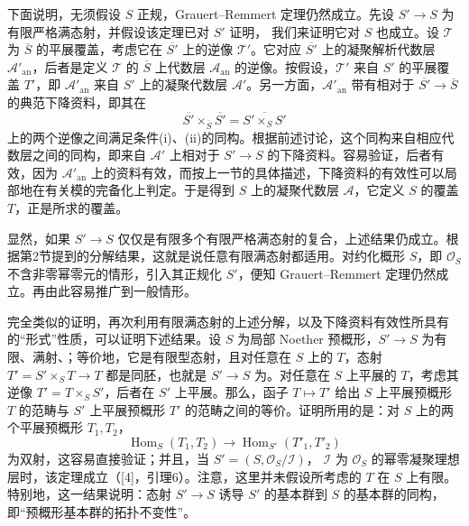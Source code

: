 下面说明，无须假设 $S$ 正规，Grauert--Remmert 定理仍然成立。先设 $S'\to S$ 为有限严格满态射，并假设该定理已对 $S'$ 证明，
我们来证明它对 $S$ 也成立。设 $\mathcal T$ 为 $\overline S$ 的平展覆盖，考虑它在 $\overline {S'}$ 上的逆像 $\mathcal T'$。它对应 $\overline {S'}$ 上的凝聚解析代数层 $\mathcal A'_{\mathrm{an}}$，后者是定义 $\mathcal T$ 的 $\overline S$ 上代数层 $\mathcal A_{\mathrm{an}}$ 的逆像。按假设，$\mathcal T'$ 来自 $S'$ 的平展覆盖 $T'$，即 $\mathcal A'_{\mathrm{an}}$ 来自 $S'$ 上的凝聚代数层 $\mathcal A'$。另一方面，$\mathcal A'_{\mathrm{an}}$ 带有相对于 $\overline {S'}\to\overline S$ 的典范下降资料，即其在
\[
\overline {S'}\times_{\overline S}\overline {S'}
=\overline{S'\times_SS'}
\]
上的两个逆像之间满足条件(i)、(ii)的同构。根据前述讨论，这个同构来自相应代数层之间的同构，即来自 $\mathcal A'$ 上相对于 $S'\to S$ 的下降资料。容易验证，后者有效，因为 $\mathcal A'_{\mathrm{an}}$ 上的资料有效，而按上一节的具体描述，下降资料的有效性可以局部地在有关模的完备化上判定。于是得到 $S$ 上的凝聚代数层 $\mathcal A$，它定义 $S$ 的覆盖 $T$，正是所求的覆盖。

显然，如果 $S'\to S$ 仅仅是有限多个有限严格满态射的复合，上述结果仍成立。根据第2节提到的分解结果，这就是说任意有限满态射都适用。对约化概形 $S$，即 $\mathcal O_S$ 不含非零幂零元的情形，引入其正规化 $S'$，便知 Grauert--Remmert 定理仍然成立。再由此容易推广到一般情形。

完全类似的证明，再次利用有限满态射的上述分解，以及下降资料有效性所具有的“形式”性质，可以证明下述结果。设 $S$ 为局部 Noether 预概形，$S'\to S$ 为有限、满射、；等价地，它是有限型态射，且对任意在 $S$ 上的 $T$，态射 $T'=S'\times_ST\to T$ 都是同胚，也就是 $S'\to S$ 为。对任意在 $S$ 上平展的 $T$，考虑其逆像 $T'=T\times_SS'$，后者在 $S'$ 上平展。那么，函子 $T\mapsto T'$ 给出 $S$ 上平展预概形 $T$ 的范畴与 $S'$ 上平展预概形 $T'$ 的范畴之间的等价。证明所用的是：对 $S$ 上的两个平展预概形 $T_1,T_2$，
\[
\operatorname{Hom}_S(T_1,T_2)\longrightarrow
\operatorname{Hom}_{S'}(T'_1,T'_2)
\]
为双射，这容易直接验证；并且，当 $S'=(S,\mathcal O_S/\mathcal I)$，
$\mathcal I$ 为 $\mathcal O_S$ 的幂零凝聚理想层时，该定理成立（[4]，引理6）。注意，这里并未假设所考虑的 $T$ 在 $S$ 上有限。特别地，这一结果说明：态射 $S'\to S$ 诱导 $S'$ 的基本群到 $S$ 的基本群的同构，即“预概形基本群的拓扑不变性”。

